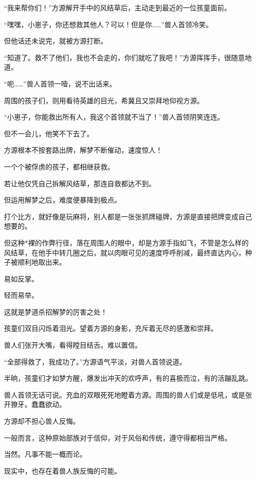 
\begin{this_body}

“我来帮你们！”方源解开手中的风结草后，主动走到最近的一位孩童面前。

“嘿嘿，小崽子，你还想救其他人？可以！但是你……”兽人首领冷笑。

但他话还未说完，就被方源打断。

“知道了。救不了他们，我也不会走的，你们就吃了我吧！”方源挥挥手，很随意地道。

“呃……”兽人首领一噎，说不出话来。

周围的孩子们，则用看待英雄的目光，希冀且又崇拜地仰视方源。

“小崽子，你能救出所有人，我这个首领就不当了！”兽人首领阴笑连连。

但不一会儿，他笑不下去了。

方源根本不按套路出牌，解梦不断催动，速度惊人！

一个个被俘虏的孩子，都相继获救。

若让他仅凭自己拆解风结草，那连自救都达不到。

但运用解梦之后，难度便暴降到极点。

打个比方，就好像是玩麻将，别人都是一张张抓牌碰牌，方源是直接把牌变成自己想要的。

但这种*裸的作弊行径，落在周围人的眼中，却是方源手指如飞，不管是怎么样的风结草，在他手中转几圈之后，就以肉眼可见的速度呼呼削减，最终直达内心，种子被顺利地取出来。

易如反掌。

轻而易举。

这就是梦道杀招解梦的厉害之处！

孩童们双目闪烁着泪光。望着方源的身影，充斥着无尽的感激和崇拜。

兽人们张开大嘴，看得瞠目结舌。难以置信。

“全部得救了，我成功了。”方源语气平淡，对兽人首领说道。

半晌，孩童们才如梦方醒，爆发出冲天的欢呼声，有的喜极而泣，有的活蹦乱跳。

兽人首领无话可说。充血的双眼死死地瞪着方源。周围的兽人们或是低吼，或是张开獠牙。蠢蠢欲动。

方源却不担心兽人反悔。

一般而言，这种原始部族对于信仰，对于风俗和传统，遵守得都相当严格。

当然。凡事不能一概而论。

现实中，也存在着兽人族反悔的可能。


\end{this_body}
